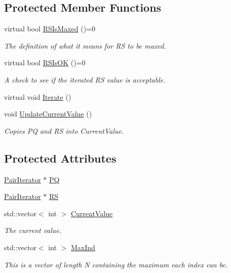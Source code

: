 \subsection*{Protected Member Functions}
\begin{DoxyCompactItemize}
\item 
virtual bool \hyperlink{classJKBuilder_1_1QuartetIterator_af88c46759ac710bbd36c17601dc62d55}{RSIsMaxed} ()=0
\begin{DoxyCompactList}\small\item\em The definition of what it means for RS to be maxed. \item\end{DoxyCompactList}\item 
virtual bool \hyperlink{classJKBuilder_1_1QuartetIterator_ac51ff9a02f4a201598f7820476c52faf}{RSIsOK} ()=0
\begin{DoxyCompactList}\small\item\em A check to see if the iterated RS value is acceptable. \item\end{DoxyCompactList}\item 
virtual void \hyperlink{classJKBuilder_1_1QuartetIterator_a7874a07e98b52f4f147cde6f39353bae}{Iterate} ()
\item 
void \hyperlink{classJKBuilder_1_1QuartetIterator_a1af5c865d6e9cfe63d0dedc53bdc13ba}{UpdateCurrentValue} ()
\begin{DoxyCompactList}\small\item\em Copies PQ and RS into CurrentValue. \item\end{DoxyCompactList}\end{DoxyCompactItemize}
\subsection*{Protected Attributes}
\begin{DoxyCompactItemize}
\item 
\hyperlink{classJKBuilder_1_1PairIterator}{PairIterator} $\ast$ \hyperlink{classJKBuilder_1_1QuartetIterator_a84f5c3632fba19d3bb85e1cffb9e51f7}{PQ}
\item 
\hyperlink{classJKBuilder_1_1PairIterator}{PairIterator} $\ast$ \hyperlink{classJKBuilder_1_1QuartetIterator_a26b777bf7ea22524f1cc725020ee2082}{RS}
\item 
std::vector$<$ int $>$ \hyperlink{classJKBuilder_1_1Iterator_a20ca24f6d827aba144bb087c4bcb74a0}{CurrentValue}
\begin{DoxyCompactList}\small\item\em The current value. \item\end{DoxyCompactList}\item 
std::vector$<$ int $>$ \hyperlink{classJKBuilder_1_1Iterator_ab6b56d3c4e9353bc938dd6249cde9ca0}{MaxInd}
\begin{DoxyCompactList}\small\item\em This is a vector of length N containing the maximum each index can be. \item\end{DoxyCompactList}\end{DoxyCompactItemize}
